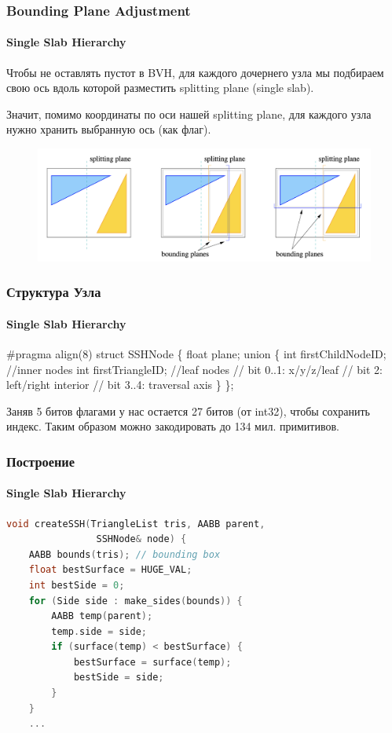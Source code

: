 \documentclass{beamer}
\begin{document}
\begin{frame}
    \frametitle{Bounding Plane Adjustment}
    \framesubtitle{Single Slab Hierarchy}
    Чтобы не оставлять пустот в BVH, для каждого дочернего узла мы подбираем
    свою ось вдоль которой разместить splitting plane (single slab).

    Значит, помимо координаты по оси нашей splitting plane, для каждого узла нужно
    хранить выбранную ось (как флаг).
    \begin{figure}
        \includegraphics[keepaspectratio, width=\textwidth]{res/splitting_ssh.png}
    \end{figure}
\end{frame}

\begin{frame}[fragile]
    \frametitle{Структура Узла}
    \framesubtitle{Single Slab Hierarchy}

    \begin{semiverbatim}
        #pragma align(8)
        struct SSHNode \{
            float plane;
            union \{
                int firstChildNodeID; //inner nodes
                int firstTriangleID; //leaf nodes
                // bit 0..1: x/y/z/leaf
                // bit 2: left/right interior
                // bit 3..4: traversal axis
            \}
        \};
    \end{semiverbatim}
    Заняв 5 битов флагами у нас остается 27 битов (от int32),
    чтобы сохранить индекс.
    Таким образом можно закодировать до 134 мил. примитивов.

\end{frame}

\begin{frame}[fragile]
    \frametitle{Построение}
    \framesubtitle{Single Slab Hierarchy}

    \begin{lstlisting}[language=C++,basicstyle=\ttfamily,keywordstyle=\color{blue}]
void createSSH(TriangleList tris, AABB parent,
                SSHNode& node) {
    AABB bounds(tris); // bounding box
    float bestSurface = HUGE_VAL;
    int bestSide = 0;
    for (Side side : make_sides(bounds)) {
        AABB temp(parent);
        temp.side = side;
        if (surface(temp) < bestSurface) {
            bestSurface = surface(temp);
            bestSide = side;
        }
    }
    ...

    \end{lstlisting}

\end{frame}
\end{document}
